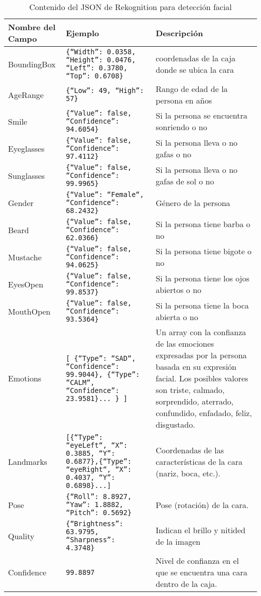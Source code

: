\begin{table}[H]
    \centering
    \begin{tabular}{|p{}|p{}|p{}|}
    \hline
    Nombre del Campo & Ejemplo & Descripción \\ \hline
    BoundingBox & \texttt{\{``Width'': 0.0358, ``Height'': 0.0476, ``Left'': 0.3780, ``Top'': 0.6708\}} & coordenadas de la caja donde se ubica la cara \\ \hline
    AgeRange & \texttt{\{``Low'': 49, ``High'': 57\}} & Rango de edad de la persona en años \\ \hline
    Smile & \texttt{\{``Value'': false, ``Confidence'': 94.6054\}} & Si la persona se encuentra sonriendo o no \\ \hline
    Eyeglasses & \texttt{\{``Value'': false, ``Confidence'': 97.4112\}} & Si la persona lleva o no gafas o no \\ \hline
    Sunglasses & \texttt{\{``Value'': false, ``Confidence'': 99.9965\}} & Si la persona lleva o no gafas de sol o no \\ \hline
    Gender & \texttt{\{``Value'': ``Female``, ``Confidence'': 68.2432\}} & Género de la persona \\ \hline
    Beard & \texttt{\{``Value'': false, ``Confidence'': 62.0366\}} & Si la persona tiene barba o no \\ \hline
    Mustache & \texttt{\{``Value'': false, ``Confidence'': 94.0625\}} & Si la persona tiene bigote o no \\ \hline
    EyesOpen & \texttt{\{``Value'': false, ``Confidence'': 99.8537\}} & Si la persona tiene los ojos abiertos o no \\ \hline
    MouthOpen & \texttt{\{``Value'': false, ``Confidence'': 93.5364\}} & Si la persona tiene la boca abierta o no \\ \hline
    Emotions & \texttt{{[} \{``Type'': ``SAD``, ``Confidence'': 99.9044\}, \{``Type'': ``CALM``, ``Confidence'': 23.9581\}... \} {]}} & Un array con la confianza de las emociones expresadas por la persona basada en su expresión facial. Los posibles valores son triste, calmado, sorprendido, aterrado, confundido, enfadado, feliz, disgustado. \\ \hline
    Landmarks & \texttt{{[}\{``Type'': ``eyeLeft``, ``X'': 0.3885, ``Y'': 0.6877\},\{``Type'': ``eyeRight``, ``X'': 0.4037, ``Y'': 0.6898\}...{]}} & Coordenadas de las características de la cara (nariz, boca, etc.). \\ \hline
    Pose & \texttt{\{``Roll'': 8.8927, ``Yaw'': 1.8882, ``Pitch'': 0.5692\}} & Pose (rotación) de la cara. \\ \hline
    Quality & \texttt{\{``Brightness'': 63.9795, ``Sharpness'': 4.3748\}} & Indican el brillo y nitided de la imagen \\ \hline
    Confidence & \texttt{99.8897} & Nivel de confianza en el que se encuentra una cara dentro de la caja. \\ \hline
    \end{tabular}
    \caption{Contenido del JSON de Rekognition para detección facial}
    \label{tab:json_rekognition}
\end{table}

